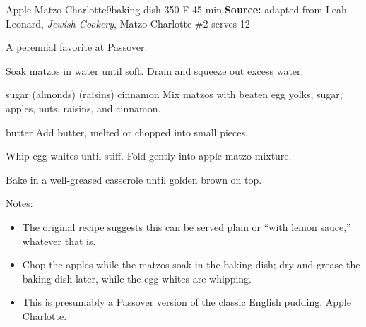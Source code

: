 \begin{recipe}{Apple Matzo Charlotte}{9\inch{}\inch baking dish \hfill 350\0 F \hfill 45 min.}{\textbf{Source:} adapted from Leah Leonard, \textit{Jewish Cookery}, Matzo Charlotte \#2 \hfill serves 12}

 \freeform A perennial favorite at Passover.

 Soak matzos in water until soft. Drain and squeeze out excess water.

  {sugar}
  {(almonds)}
  {(raisins)}
  {cinnamon}
 Mix matzos with beaten egg yolks, sugar, apples, nuts, raisins, and cinnamon.

  {butter}
 Add butter, melted or chopped into small pieces.

 Whip egg whites until stiff. Fold gently into apple-matzo mixture.

 \newstep Bake in a well-greased casserole until golden brown on top.

 \freeform Notes:
 \begin{itemize}
  \item The original recipe suggests this can be served plain or ``with lemon sauce,'' whatever that is.
  \item Chop the apples while the matzos soak in the baking dish; dry and grease the baking dish later, while the egg whites are whipping.
  \item This is presumably a Passover version of the classic English pudding, \href{https://www.theguardian.com/food/2020/oct/21/how-to-make-the-perfect-apple-charlotte-recipe}{Apple Charlotte}.
 \end{itemize}
\end{recipe}
